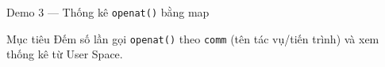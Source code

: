 \begin{frame}{Demo 3 — Thống kê \texttt{openat()} bằng map}
  \begin{block}{Mục tiêu}
    Đếm số lần gọi \texttt{openat()} theo \texttt{comm} (tên tác vụ/tiến trình)
    và xem thống kê từ User Space.
  \end{block}
  \vspace{0.22cm}
  \begin{center}
  \end{center}
\end{frame}
